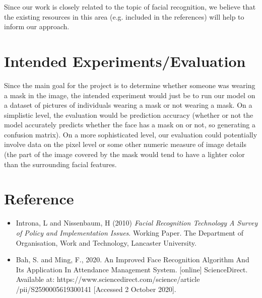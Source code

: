 \documentclass{article}
\begin{document}
Since our work is closely related to the topic of facial recognition, we believe that the existing resources in this area (e.g. included in the references) will help to inform our approach.

\section*{Intended Experiments/Evaluation}
Since the main goal for the project is to determine whether someone was wearing a mask in the image, the intended experiment would just be to run our model on a dataset of pictures of individuals wearing a mask or not wearing a mask. On a simplistic level, the evaluation would be prediction accuracy (whether or not the model accurately predicts whether the face has a mask on or not, so generating a confusion matrix). On a more sophisticated level, our evaluation could potentially involve data on the pixel level or some other numeric measure of image details (the part of the image covered by the mask would tend to have a lighter color than the surrounding facial features.  

\section*{Reference}
\begin{itemize}
    \item Introna, L and Nissenbaum, H (2010) \textit{Facial Recognition Technology A Survey of Policy and Implementation Issues}. Working Paper. The Department of Organisation, Work and Technology, Lancaster University.
    \item Bah, S. and Ming, F., 2020. An Improved Face Recognition Algorithm And Its Application In Attendance Management System. [online] ScienceDirect. Available at: https://www.sciencedirect.com/science/article\\
    /pii/S2590005619300141 [Accessed 2 October 2020].

\end{itemize}
\end{document}
